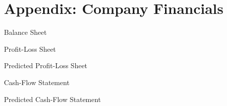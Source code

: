 

\section{Appendix: Company Financials}
        
{Balance Sheet}
        
{Profit-Loss Sheet}
        
{Predicted Profit-Loss Sheet}
		
{Cash-Flow Statement}		
		
{Predicted Cash-Flow Statement}
        














